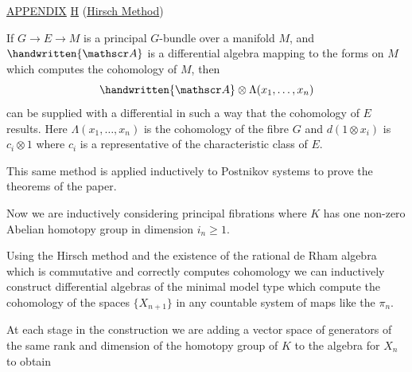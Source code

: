 \uline{APPENDIX} \uline{H} (\uline{Hirsch Method})

If $G\to E\to M$ is a principal $G$-bundle over a manifold $M$, and $\handwritten{\mathscr A}$ is a differential algebra mapping to the forms on $M$ which computes the cohomology of $M$, then
\[
\handwritten{\mathscr A}\otimes\Lambda(x_1,\ldots,x_n)
\]
can be supplied with a differential in such a way that the cohomology of $E$ results. Here $\Lambda(x_1,\ldots,x_n)$ is the cohomology of the fibre $G$ and $d(1\otimes x_i)$ is $c_i\otimes1$ where $c_i$ is a representative of the characteristic class of $E$.

This same method is applied inductively to Postnikov systems to prove the theorems of the paper.

Now we are inductively considering principal fibrations
where $K$ has one non-zero Abelian homotopy group in dimension $i_n\geq1$.

Using the Hirsch method and the existence of the rational de Rham algebra which is commutative and correctly computes cohomology we can inductively construct differential algebras of the minimal model type which compute the cohomology of the spaces $\{X_{n+1}\}$ in any countable system of maps like the $\pi_n$.

At each stage in the construction we are adding a vector space of generators of the same rank and dimension of the homotopy group of $K$ to the algebra for $X_n$ to obtain
